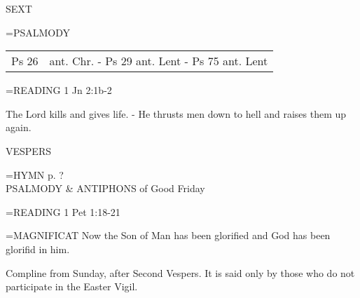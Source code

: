 \begin{flushleft}\normalsize SEXT\\\end{flushleft}
\hangindent=\parindent \small{PSALMODY}
\begin{center}
\begin{tabular}{ l l }
Ps 26 &  ant. Chr. - Ps 29 ant. Lent - Ps 75 ant. Lent\\
\end{tabular}
\end{center}		

\hangindent=\parindent \small{READING}    1 Jn 2:1b-2 \textbf{   }

The Lord kills and gives life.
- He thrusts men down to hell and raises them up again.

\begin{flushleft}\normalsize VESPERS\\\end{flushleft}
\hangindent=\parindent \small{\uppercase{HYMN} p.  ?\\}
PSALMODY \& ANTIPHONS of Good Friday

\hangindent=\parindent \small{READING}    1 Pet 1:18-21 \textbf{   \\}

\hangindent=\parindent \small{MAGNIFICAT 	Now the Son of Man has been glorified and God has been glorifid in him.\\}

Compline from Sunday, after Second Vespers. It is said only by those who do not participate in the Easter Vigil.

